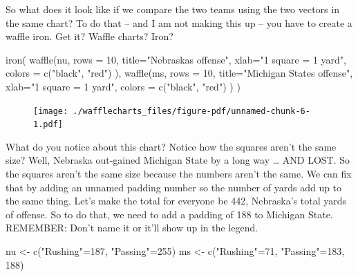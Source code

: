 \documentclass[
  letterpaper,
  DIV=11,
  numbers=noendperiod]{scrreprt}
\newenvironment{Shaded}{\begin{snugshade}}{\end{snugshade}}
\newcommand{\AttributeTok}[1]{\textcolor[rgb]{0.40,0.45,0.13}{#1}}
\newcommand{\DecValTok}[1]{\textcolor[rgb]{0.68,0.00,0.00}{#1}}
\newcommand{\FunctionTok}[1]{\textcolor[rgb]{0.28,0.35,0.67}{#1}}
\newcommand{\NormalTok}[1]{\textcolor[rgb]{0.00,0.23,0.31}{#1}}
\newcommand{\OtherTok}[1]{\textcolor[rgb]{0.00,0.23,0.31}{#1}}
\newcommand{\StringTok}[1]{\textcolor[rgb]{0.13,0.47,0.30}{#1}}
\begin{document}
So what does it look like if we compare the two teams using the two
vectors in the same chart? To do that -- and I am not making this up --
you have to create a waffle iron. Get it? Waffle charts? Iron?

\begin{Shaded}
\begin{Highlighting}[]
\FunctionTok{iron}\NormalTok{(}
 \FunctionTok{waffle}\NormalTok{(nu, }
        \AttributeTok{rows =} \DecValTok{10}\NormalTok{, }
        \AttributeTok{title=}\StringTok{"Nebraska\textquotesingle{}s offense"}\NormalTok{, }
        \AttributeTok{xlab=}\StringTok{"1 square = 1 yard"}\NormalTok{, }
        \AttributeTok{colors =} \FunctionTok{c}\NormalTok{(}\StringTok{"black"}\NormalTok{, }\StringTok{"red"}\NormalTok{)}
\NormalTok{        ),}
 \FunctionTok{waffle}\NormalTok{(ms, }
        \AttributeTok{rows =} \DecValTok{10}\NormalTok{, }
        \AttributeTok{title=}\StringTok{"Michigan State\textquotesingle{}s offense"}\NormalTok{, }
        \AttributeTok{xlab=}\StringTok{"1 square = 1 yard"}\NormalTok{, }
        \AttributeTok{colors =} \FunctionTok{c}\NormalTok{(}\StringTok{"black"}\NormalTok{, }\StringTok{"red"}\NormalTok{)}
\NormalTok{        )}
\NormalTok{)}
\end{Highlighting}
\end{Shaded}

\begin{figure}[H]

{\centering \texttt{[image: ./wafflecharts\_files/figure-pdf/unnamed-chunk-6-1.pdf]}

}

\end{figure}

What do you notice about this chart? Notice how the squares aren't the
same size? Well, Nebraska out-gained Michigan State by a long way
\ldots{} AND LOST. So the squares aren't the same size because the
numbers aren't the same. We can fix that by adding an unnamed padding
number so the number of yards add up to the same thing. Let's make the
total for everyone be 442, Nebraska's total yards of offense. So to do
that, we need to add a padding of 188 to Michigan State. REMEMBER: Don't
name it or it'll show up in the legend.

\begin{Shaded}
\begin{Highlighting}[]
\NormalTok{nu }\OtherTok{\textless{}{-}} \FunctionTok{c}\NormalTok{(}\StringTok{"Rushing"}\OtherTok{=}\DecValTok{187}\NormalTok{, }\StringTok{"Passing"}\OtherTok{=}\DecValTok{255}\NormalTok{)}
\NormalTok{ms }\OtherTok{\textless{}{-}} \FunctionTok{c}\NormalTok{(}\StringTok{"Rushing"}\OtherTok{=}\DecValTok{71}\NormalTok{, }\StringTok{"Passing"}\OtherTok{=}\DecValTok{183}\NormalTok{, }\DecValTok{188}\NormalTok{)}
\end{Highlighting}
\end{Shaded}
\end{document}
